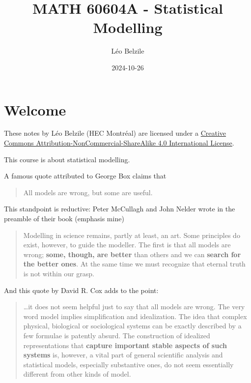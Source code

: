 \documentclass[
  11pt,
  letterpaper,
]{scrbook}
\title{MATH 60604A - Statistical Modelling}
\author{Léo Belzile}
\date{2024-10-26}
\renewcommand*\contentsname{Table of contents}
\newcommand\contentsname{Table of contents}
\theoremstyle{plain}
\theoremstyle{plain}
\theoremstyle{definition}
\theoremstyle{definition}
\theoremstyle{remark}
\begin{document}


\renewcommand*\contentsname{Table of contents}
{
\setcounter{tocdepth}{2}
\tableofcontents
}

\mainmatter
{}

\chapter*{Welcome}\label{welcome}


These notes by Léo Belzile (HEC Montréal) are licensed under a
\href{http://creativecommons.org/licenses/by-nc-sa/4.0/}{Creative
Commons Attribution-NonCommercial-ShareAlike 4.0 International License}.

This course is about statistical modelling.

A famous quote attributed to George Box claims that

\begin{quote}
All models are wrong, but some are useful.
\end{quote}

This standpoint is reductive: Peter McCullagh and John Nelder wrote in
the preamble of their book (emphasis mine)

\begin{quote}
Modelling in science remains, partly at least, an art. Some principles
do exist, however, to guide the modeller. The first is that all models
are wrong; \textbf{some, though, are better} than others and we can
\textbf{search for the better ones}. At the same time we must recognize
that eternal truth is not within our grasp.
\end{quote}

And this quote by David R. Cox adds to the point:

\begin{quote}
\ldots it does not seem helpful just to say that all models are wrong.
The very word model implies simplification and idealization. The idea
that complex physical, biological or sociological systems can be exactly
described by a few formulae is patently absurd. The construction of
idealized representations that \textbf{capture important stable aspects
of such systems} is, however, a vital part of general scientific
analysis and statistical models, especially substantive ones, do not
seem essentially different from other kinds of model.
\end{quote}
\end{document}
